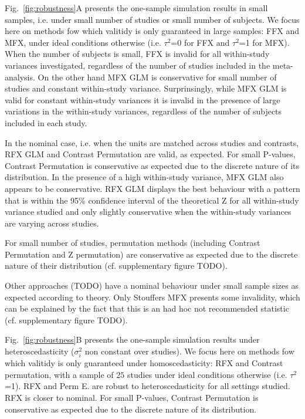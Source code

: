 \documentclass[preprint]{elsarticle}
\newcommand{\varBetween}{\tau^2}
\newcommand{\varWithin}[1][i]{\sigma^2_{#1}}
\begin{document}

Fig.~\ref{fig:robustness}A presents the one-sample simulation results in small samples, i.e. under small number of studies or small number of subjects. We focus here on methods fow which valitidy is only guaranteed in large samples: FFX and MFX, under ideal conditions otherwise (i.e. $\varBetween$=0 for FFX and $\varBetween$=1 for MFX). When the number of subjects is small, FFX is invalid for all within-study variances investigated, regardless of the number of studies included in the meta-analysis. On the other hand MFX GLM is conservative for small number of studies and constant within-study variance. Surprinsingly, while MFX GLM is valid for constant within-study variances it is invalid in the presence of large variations in the within-study variances, regardless of the number of subjects included in each study. 

In the nominal case, i.e. when the units are matched across studies and contrasts, RFX GLM and Contrast Permutation are valid, as expected. For small P-values, Contrast Permutation is conservative as expected due to the discrete nature of its distribution. In the presence of a high within-study variance, MFX GLM also appears to be conservative. RFX GLM displays the best behaviour with a pattern that is within the 95\% confidence interval of the theoretical Z for all within-study variance studied and only slightly conservative when the within-study variances are varying across studies.

For small number of studies, permutation methods (including Contrast Permutation and Z permutation) are conservative as expected due to the discrete nature of their distribution (cf. supplementary figure TODO).

Other approaches (TODO) have a nominal behaviour under small sample sizes as expected according to theory. Only Stouffers MFX presents some invalidity, which can be explained by the fact that this is an had hoc not recommended statistic (cf. supplementary figure TODO).

Fig.~\ref{fig:robustness}B presents the one-sample simulation results under heteroscedasticity ($\varWithin$ non constant over studies). We focus here on methods fow which valitidy is only guaranteed under homoscedasticity: RFX and Contrast permutation, with a sample of $25$ studies under ideal conditions otherwise (i.e. $\varBetween$=1). RFX and Perm E. are robust to heteroscedasticity for all settings studied. RFX is closer to nominal. For small P-values, Contrast Permutation is conservative as expected due to the discrete nature of its distribution.
\end{document}
